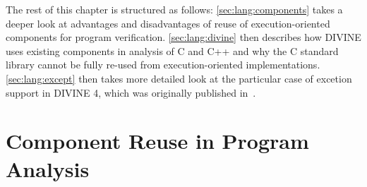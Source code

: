 The rest of this chapter is structured as follows: \autoref{sec:lang:components} takes a deeper look at advantages and disadvantages of reuse of execution-oriented components for program verification.
\autoref{sec:lang:divine} then describes how DIVINE uses existing components in analysis of C and C++ and why the C standard library cannot be fully re-used from execution-oriented implementations.
\autoref{sec:lang:except} then takes more detailed look at the particular case of excetion support in DIVINE 4, which was originally published in~.


\section{Component Reuse in Program Analysis}\label{sec:lang:components}

